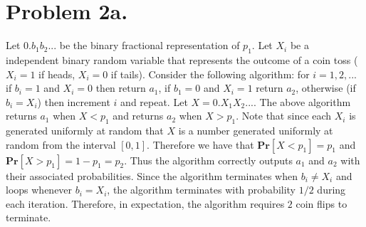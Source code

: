 \documentclass[12pt]{article}
\begin{document}
\pagestyle{plain}
\titleformat{\subsection}[runin]
  {\normalfont\large\bfseries}{\thesubsection}{1em}{}
\titleformat{\subsubsection}[runin]
  {\normalfont\large\bfseries}{\thesubsubsection}{1em}{}

\section*{Problem 2a.}
Let $0.b_1b_2...$ be the binary fractional representation of $p_1$. Let $X_i$
be a independent binary random variable that represents the outcome of a coin
toss ($X_i = 1$ if heads, $X_i = 0$ if tails). Consider the following algorithm:
for $i = 1,2,...$ if $b_i = 1$ and $X_i = 0$ then return $a_1$, if $b_1 = 0$ and
$X_i = 1$ return $a_2$, otherwise (if $b_i = X_i$) then increment $i$ and repeat.
Let $X = 0.X_1X_2...$. The above algorithm returns $a_1$ when $X < p_1$ and
returns $a_2$ when $X > p_1$. Note that since each $X_i$ is generated
uniformly at random that $X$ is a number generated uniformly at random from
the interval $[0,1]$. Therefore we have that $\textbf{Pr}[X < p_1] = p_1$ and
$\textbf{Pr}[X > p_1] = 1 - p_1 = p_2$. Thus the algorithm correctly outputs
$a_1$ and $a_2$ with their associated probabilities. Since the algorithm
terminates when $b_i \neq X_i$ and loops whenever $b_i = X_i$, the algorithm
terminates with probability $1/2$ during each iteration. Therefore, in
expectation, the algorithm requires $2$ coin flips to terminate.
\end{document}
